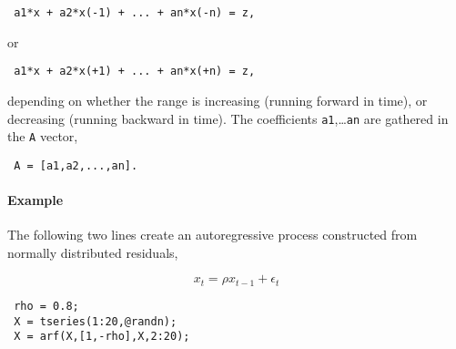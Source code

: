  \begin{verbatim}
 a1*x + a2*x(-1) + ... + an*x(-n) = z,
 \end{verbatim}
 
 or
 
 \begin{verbatim}
 a1*x + a2*x(+1) + ... + an*x(+n) = z,
 \end{verbatim}
 
 depending on whether the range is increasing (running forward in time),
 or decreasing (running backward in time). The coefficients
 \texttt{a1},\ldots{}\texttt{an} are gathered in the \texttt{A} vector,
 
 \begin{verbatim}
 A = [a1,a2,...,an].
 \end{verbatim}
 
 \paragraph{Example}
 
 The following two lines create an autoregressive process constructed
 from normally distributed residuals,
 
 \[ x_t = \rho x_{t-1} + \epsilon_t \]
 
 \begin{verbatim}
 rho = 0.8;
 X = tseries(1:20,@randn);
 X = arf(X,[1,-rho],X,2:20);
 \end{verbatim}


